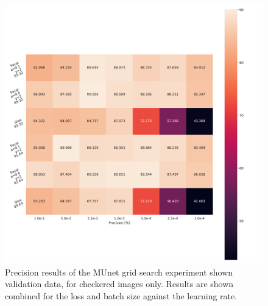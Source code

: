 \begin{figure}[H]
\begin{center}
    \includegraphics[width=\columnwidth]{imgs/munet_grid_heat_P_C.pdf}
    \caption{Precision results of the \ac{MUnet} grid search experiment shown validation data, for checkered images only. Results are shown combined for the loss and batch size against the learning rate.}
    \label{fig:munet_pc_heat}
\end{center}
\end{figure}

